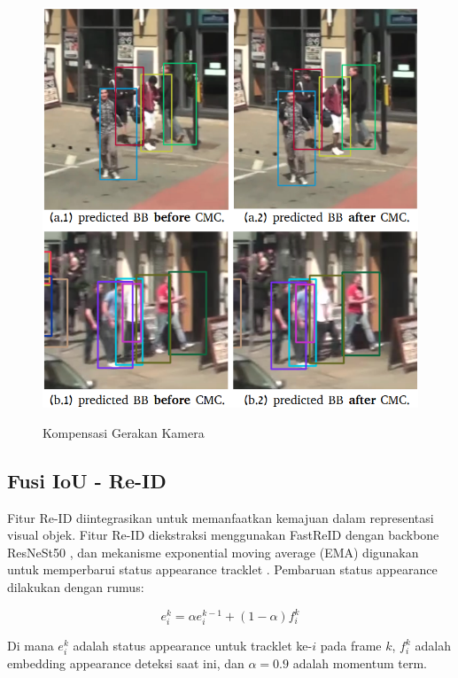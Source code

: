 \begin{figure}[H]
  \centering
  \includegraphics[scale=0.35]{gambar/cmc_pred.png}
  \label{fig:cmc}
  \caption{Kompensasi Gerakan Kamera}
\end{figure}

\subsection{Fusi IoU - Re-ID}

Fitur Re-ID diintegrasikan untuk memanfaatkan kemajuan dalam representasi visual objek. Fitur Re-ID diekstraksi menggunakan FastReID dengan backbone ResNeSt50 \parencite{he2020fastreid, zhang2020resnest}, dan mekanisme exponential moving average (EMA) digunakan untuk memperbarui status appearance tracklet \parencite{wang2020towards}. Pembaruan status appearance dilakukan dengan rumus:

\begin{equation}
e_i^k = \alpha e_i^{k-1} + (1 - \alpha) f_i^k
\end{equation}

Di mana $e_i^k$ adalah status appearance untuk tracklet ke-$i$ pada frame $k$, $f_i^k$ adalah embedding appearance deteksi saat ini, dan $\alpha=0.9$ adalah momentum term.

